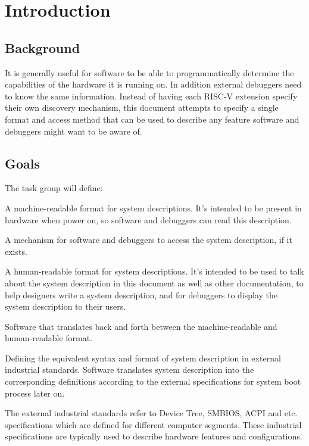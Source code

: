 \chapter{Introduction}

\section{Background}

It is generally useful for software to be able to programmatically determine the
capabilities of the hardware it is running on. In addition external debuggers
need to know the same information. Instead of having each RISC-V extension
specify their own discovery mechanism, this document attempts to specify a
single format and access method that can be used to describe any feature
software and debuggers might want to be aware of.

\section{Goals}

\begin{steps}{The task group will define:}
\item A machine-readable format for system descriptions. It's intended to be
present in hardware when power on, so software and debuggers can read this
description. 
\item A mechanism for software and debuggers to access the system description,
if it exists.
\item A human-readable format for system descriptions. It's intended to be used
to talk about the system description in this document as well as other
documentation, to help designers write a system description, and for debuggers
to display the system description to their users.
\item Software that translates back and forth between the machine-readable and
human-readable format.
\item Defining the equivalent syntax and format of system description in external 
industrial standards. Software translates system description into the corresponding 
definitions according to the external specifications for system boot process later 
on.

\begin{commentary}
The external industrial standards refer to Device Tree, SMBIOS, ACPI and etc. 
specifications which are defined for different computer segments. These industrial 
specifications are typically used to describe hardware features and configurations.
\end{commentary}

\end{steps}

